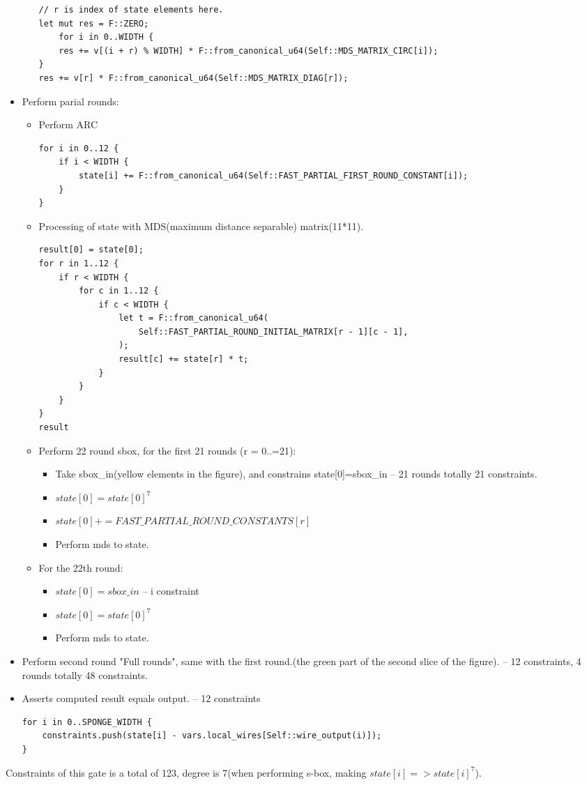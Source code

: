 \begin{itemize}
\begin{itemize}
\begin{lstlisting}
// r is index of state elements here.
let mut res = F::ZERO;
    for i in 0..WIDTH {
    res += v[(i + r) % WIDTH] * F::from_canonical_u64(Self::MDS_MATRIX_CIRC[i]);
}
res += v[r] * F::from_canonical_u64(Self::MDS_MATRIX_DIAG[r]);
        \end{lstlisting}
    \end{itemize}
    \item Perform parial rounds:
    \begin{itemize}
        \item Perform ARC
        \begin{lstlisting}
for i in 0..12 {
    if i < WIDTH {
        state[i] += F::from_canonical_u64(Self::FAST_PARTIAL_FIRST_ROUND_CONSTANT[i]);
    }
}
        \end{lstlisting}
        \item Processing of state with MDS(maximum distance separable) matrix(11*11).
        \begin{lstlisting}
result[0] = state[0];
for r in 1..12 {
    if r < WIDTH {
        for c in 1..12 {
            if c < WIDTH {
                let t = F::from_canonical_u64(
                    Self::FAST_PARTIAL_ROUND_INITIAL_MATRIX[r - 1][c - 1],
                );
                result[c] += state[r] * t;
            }
        }
    }
}
result
        \end{lstlisting}
        \item Perform 22 round sbox, for the first 21 rounds (r = 0..=21):
        \begin{itemize}
            \item Take sbox\_in(yellow elements in the figure), and constrains state[0]=sbox\_in -- 21 rounds totally 21 constraints.
            \item $state[0] =state[0]^7$
            \item $state[0] += FAST\_PARTIAL\_ROUND\_CONSTANTS[r]$
            \item Perform mds to state.
        \end{itemize}
        \item For the 22th round:
        \begin{itemize}
            \item $state[0] = sbox\_in$ -- i constraint
            \item $state[0] =state[0]^7$
            \item Perform mds to state.
        \end{itemize}
    \end{itemize}
    \item Perform second round "Full rounds", same with the first round.(the green part of the second slice of the figure). -- 12 constraints, 4 rounds totally 48 constraints.
    \item Asserts computed result equals output. -- 12 constraints
    \begin{lstlisting}
for i in 0..SPONGE_WIDTH {
    constraints.push(state[i] - vars.local_wires[Self::wire_output(i)]);
}
    \end{lstlisting}
\end{itemize}

Constraints of this gate is a total of 123, degree is 7(when performing s-box, making $state[i] => state[i]^7$).